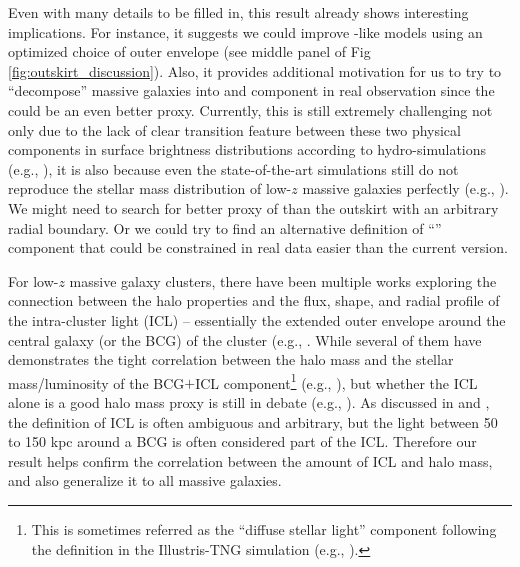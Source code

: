 \documentclass[fleqn,usenatbib,useAMS,english]{mnras}
\begin{document}
    Even with many details to be filled in, this result already shows interesting implications. 
    For instance, it suggests we could improve \asap{}-like models using an
    optimized choice of outer envelope \mstar{} 
    (see middle panel of Fig \ref{fig:outskirt_discussion}).
    Also, it provides additional motivation for us to try to ``decompose'' massive galaxies into
    \insitu{} and \exsitu{} component in real observation since the \exsitu{} \mstar{} could 
    be an even better \mvir{} proxy.
    Currently, this is still extremely challenging not only due to the lack of clear transition 
    feature between these two physical components in surface brightness distributions according
    to hydro-simulations (e.g., \citealt{Remus2021}), it is also because even the 
    state-of-the-art simulations still do not reproduce the stellar mass distribution of 
    low-$z$ massive galaxies perfectly (e.g., \citealt{Ardila2021}).
    We might need to search for better proxy of \exsitu{} \mstar{} than the outskirt \mstar{}
    with an arbitrary radial boundary. 
    Or we could try to find an alternative definition of ``\exsitu{}'' component that could 
    be constrained in real data easier than the current version.

    For low-$z$ massive galaxy clusters, there have been multiple works exploring the connection
    between the halo properties and the flux, shape, and radial profile of the intra-cluster
    light (ICL) -- essentially the extended outer envelope around the central galaxy (or the BCG)
    of the cluster (e.g., \citealt{Montes2018, Montes2019, Zhang2019b, Furnell2021, Kluge2021,
    SampaioSantos2021}.
    While several of them have demonstrates the tight correlation between the halo mass and 
    the stellar mass/luminosity of the BCG$+$ICL component\footnote{This is sometimes referred
    as the ``diffuse stellar light'' component following the definition in the Illustris-TNG
    simulation (e.g., \citealt{Zhang2019b, SampaioSantos2021}).} 
    (e.g., \citet{Zhang2019b, Kluge2021, SampaioSantos2021}), but whether the ICL alone is a 
    good halo mass proxy is still in debate (e.g., \citealt{Furnell2021}).
    As discussed in \citet{Huang2018b} and \citet{Kluge2020}, the definition of ICL is often 
    ambiguous and arbitrary, but the light between 50 to 150 kpc around a BCG is often considered 
    part of the ICL.
    Therefore our result helps confirm the correlation between the amount of ICL and halo mass,
    and also generalize it to all massive galaxies.
\end{document}
